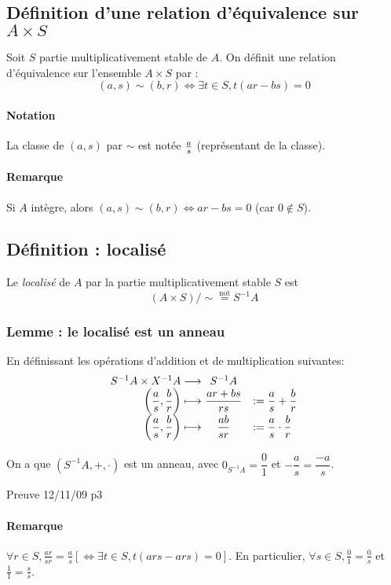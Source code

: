 \documentclass[reqno,a4paper,10pt]{report}
\newcommand{\tnot}[1]{\overset{\text{not}}{ #1 }}
\begin{document}
\subsection{Définition d'une relation d'équivalence sur $A\times S$}
Soit $S$ partie multiplicativement stable de $A$. On définit une relation
d'équivalence sur l'ensemble $A\times S$ par :
\[(a,s) \sim (b,r) \iff \exists t \in S, t(ar-bs)=0\]

\paragraph{Notation}
La classe de $(a,s)$ par $\sim$ est notée $a\over s$ (représentant de
la classe).

\paragraph{Remarque}
Si $A$ intègre, alors $(a,s)\sim(b,r) \iff ar-bs=0$ (car $0\not \in S$).

\subsection{Définition : localisé}
Le \emph{localisé} de $A$ par la partie multiplicativement stable $S$ est
\[(A\times S) /\sim \tnot{=} S^{-1} A\]

\subsubsection{Lemme : le localisé est un anneau}
En définissant les opérations d'addition et de multiplication suivantes:
\[
\begin{array}[t]{r@{\ }cl}
  S^{-1}A \times X^{-1}A \longrightarrow& S^{-1}A&\\
  \left(\dfrac{a}{s}, \dfrac{b}{r}\right) \longmapsto& \dfrac{ar+bs}{rs}
  &:= \dfrac{a}{s} + \dfrac{b}{r}\\
  \left(\dfrac{a}{s}, \dfrac{b}{r}\right) \longmapsto& \dfrac{ab}{sr}
  &:= \dfrac{a}{s} \cdot \dfrac{b}{r}
\end{array}
\]

On a que $\left( S^{-1}A, +, \cdot \right)$ est un anneau, avec
$0_{S^{-1}A}=\dfrac{0}{1}$ et $-\dfrac{a}{s}=\dfrac{-a}{s}$.

  Preuve 12/11/09 p3

\paragraph{Remarque}
$\forall r \in S, \frac{ar}{sr}=\frac{a}{s} \left[ \iff \exists
t\in S, t(ars-ars)=0 \right]$. En particulier, $\forall s \in S,
\frac{0}{1}=\frac{0}{s}$ et $\frac{1}{1}=\frac{s}{s}$.
\end{document}
